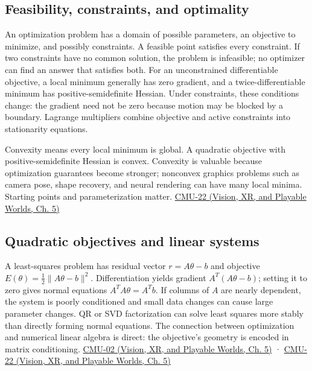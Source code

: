 \subsection{Feasibility, constraints, and optimality}\label{04-visual-computing-ii-ch029-feasibility-constraints-and-optimality}

\hypertarget{04-visual-computing-ii-ch029-feasibility-constraints-and-optimality}{}

An optimization problem has a domain of possible parameters, an objective to minimize, and possibly constraints. A feasible point satisfies every constraint. If two constraints have no common solution, the problem is infeasible; no optimizer can find an answer that satisfies both. For an unconstrained differentiable objective, a local minimum generally has zero gradient, and a twice-differentiable minimum has positive-semidefinite Hessian. Under constraints, these conditions change: the gradient need not be zero because motion may be blocked by a boundary. Lagrange multipliers combine objective and active constraints into stationarity equations.

Convexity means every local minimum is global. A quadratic objective with positive-semidefinite Hessian is convex. Convexity is valuable because optimization guarantees become stronger; nonconvex graphics problems such as camera pose, shape recovery, and neural rendering can have many local minima. Starting points and parameterization matter. \href{../07-Vision-XR-and-Playable-Worlds/main.pdf\#nameddest=04-visual-computing-ii-ch036-cmu-22---optimization}{CMU-22 (Vision, XR, and Playable Worlds, Ch. 5)}

\subsection{Quadratic objectives and linear systems}\label{04-visual-computing-ii-ch029-quadratic-objectives-and-linear-systems}

\hypertarget{04-visual-computing-ii-ch029-quadratic-objectives-and-linear-systems}{}

A least-squares problem has residual vector \(r=A\theta-b\) and objective \(E(\theta)=\tfrac12\|A\theta-b\|^2\). Differentiation yields gradient \(A^T(A\theta-b)\); setting it to zero gives normal equations \(A^TA\theta=A^Tb\). If columns of \(A\) are nearly dependent, the system is poorly conditioned and small data changes can cause large parameter changes. QR or SVD factorization can solve least squares more stably than directly forming normal equations. The connection between optimization and numerical linear algebra is direct: the objective's geometry is encoded in matrix conditioning. \href{../07-Vision-XR-and-Playable-Worlds/main.pdf\#nameddest=04-visual-computing-ii-ch036-cmu-02---linear-algebra-preview}{CMU-02 (Vision, XR, and Playable Worlds, Ch. 5)} · \href{../07-Vision-XR-and-Playable-Worlds/main.pdf\#nameddest=04-visual-computing-ii-ch036-cmu-22---optimization}{CMU-22 (Vision, XR, and Playable Worlds, Ch. 5)}

